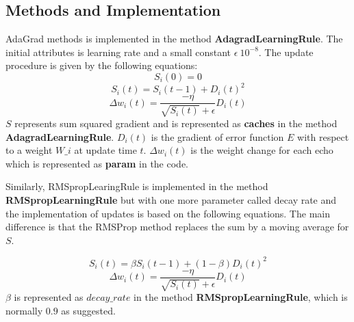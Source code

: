 \documentclass[11pt]{article}
\begin{document}
\subsection{Methods and Implementation}
AdaGrad methods is implemented in the method {\bf AdagradLearningRule}. The initial attributes is learning rate and a small constant $\epsilon ~ 10^{-8}$. The update procedure is given by the following equations:
\begin{equation}
	S_i(0) = 0
\end{equation}
\begin{equation}
	S_i(t) = S_i(t-1) + D_i(t)^2
\end{equation}
\begin{equation}
	\Delta w_i(t) = \frac{-\eta }{\sqrt{S_i(t)}+\epsilon }D_i(t)
\end{equation}
$S$ represents sum squared gradient and is represented as {\bf caches} in the method {\bf AdagradLearningRule}. $D_i(t)$ is the gradient of error function $E$ with respect to a weight $W\_i$ at update time $t$. $\Delta w_i(t)$ is the weight change for each echo which is represented as {\bf param} in the code.

Similarly, RMSpropLearingRule is implemented in the method {\bf RMSpropLearningRule} but with one more parameter called decay rate and the implementation of updates is based on the following equations. The main difference is that the RMSProp method replaces the sum by a moving average for $S$.

\begin{equation}
	S_i(t) = \beta S_i(t-1) + (1-\beta)D_i(t)^2
\end{equation}
\begin{equation}
	\Delta w_i(t) = \frac{-\eta }{\sqrt{S_i(t)}+\epsilon }D_i(t)
\end{equation}
$\beta$ is represented as $decay\_rate$ in the method {\bf RMSpropLearningRule}, which is normally $0.9$ as suggested.
\end{document}
